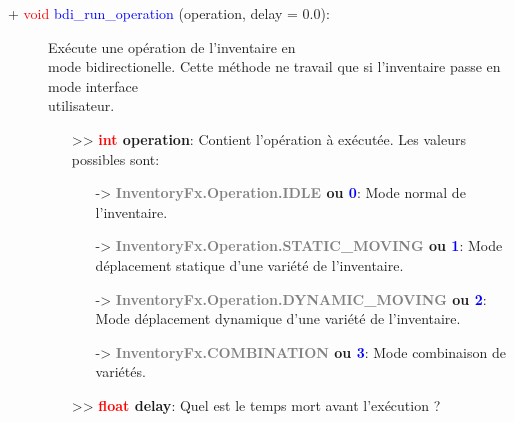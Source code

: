 \documentclass[a4paper, 11pt]{article}
\begin{document}
	\begin{description}
		\item [+ \textcolor{red}{void} \textcolor{blue}{bdi\_run\_operation} (operation, delay = 0.0):] 
		Exécute une opération de l'inventaire en \\mode bidirectionelle. Cette méthode ne travail que si 
		l'inventaire passe en mode interface \\utilisateur.
		\begin{itemize}
			\item[>> \textbf{\textcolor{red}{int} operation}:] Contient l'opération à exécutée. Les valeurs
			possibles sont:
			\begin{itemize}
				\item [-> \textbf{\textcolor{gray}{InventoryFx.Operation.IDLE} ou \textcolor{blue}{0}}:] 
				Mode normal de l'inventaire.
				\item [-> \textbf{\textcolor{gray}{InventoryFx.Operation.STATIC\_MOVING} ou \textcolor{blue}
				{1}}:] Mode déplacement statique d'une variété de l'inventaire.
				\item [-> \textbf{\textcolor{gray}{InventoryFx.Operation.DYNAMIC\_MOVING} ou 
				\textcolor{blue}{2}}:] Mode déplacement dynamique d'une variété de l'inventaire.
				\item [-> \textbf{\textcolor{gray}{InventoryFx.COMBINATION} ou \textcolor{blue}{3}}:] 
				Mode combinaison de variétés.
			\end{itemize}
			\item [>> \textbf{\textcolor{red}{float} delay}:] Quel est le temps mort avant l'exécution ?\\
		\end{itemize}
	\end{description}

\end{document}
